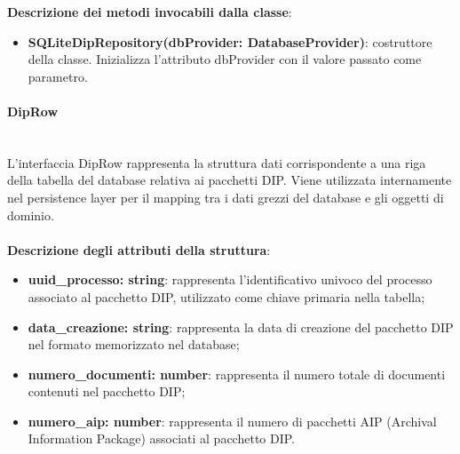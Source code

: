 \documentclass[a4paper,12pt]{article}
\begin{document}
              \noindent \textbf{Descrizione dei metodi invocabili dalla classe}:
                \begin{itemize}
                    \item \textbf{SQLiteDipRepository(dbProvider: DatabaseProvider)}: costruttore della classe. Inizializza l'attributo dbProvider con il valore passato come parametro.
                \end{itemize}

                \paragraph{DipRow}\label{par:DipRow}\mbox{}\\
                L'interfaccia DipRow rappresenta la struttura dati corrispondente a una riga della tabella del database relativa ai pacchetti DIP. Viene utilizzata internamente nel persistence layer per il mapping tra i dati grezzi del database e gli oggetti di dominio.\\
                \\
                \textbf{Descrizione degli attributi della struttura}:
                \begin{itemize}
                    \item \textbf{uuid\_processo: string}: rappresenta l'identificativo univoco del processo associato al pacchetto DIP, utilizzato come chiave primaria nella tabella;
                    \item \textbf{data\_creazione: string}: rappresenta la data di creazione del pacchetto DIP nel formato memorizzato nel database;
                    \item \textbf{numero\_documenti: number}: rappresenta il numero totale di documenti contenuti nel pacchetto DIP;
                    \item \textbf{numero\_aip: number}: rappresenta il numero di pacchetti AIP (Archival Information Package) associati al pacchetto DIP.
                \end{itemize}
\end{document}
